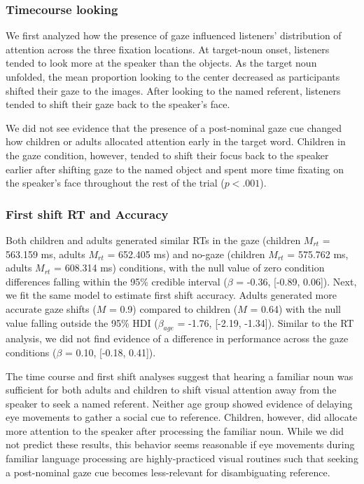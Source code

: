 \documentclass[10pt, letterpaper]{article}
\begin{document}
\hypertarget{timecourse-looking}{%
\subsubsection{Timecourse looking}\label{timecourse-looking}}

We first analyzed how the presence of gaze influenced listeners'
distribution of attention across the three fixation locations. At
target-noun onset, listeners tended to look more at the speaker than the
objects. As the target noun unfolded, the mean proportion looking to the
center decreased as participants shifted their gaze to the images. After
looking to the named referent, listeners tended to shift their gaze back
to the speaker's face.

We did not see evidence that the presence of a post-nominal gaze cue
changed how children or adults allocated attention early in the target
word. Children in the gaze condition, however, tended to shift their
focus back to the speaker earlier after shifting gaze to the named
object and spent more time fixating on the speaker's face throughout the
rest of the trial (\(p < .001\)).

\hypertarget{first-shift-rt-and-accuracy}{%
\subsubsection{First shift RT and
Accuracy}\label{first-shift-rt-and-accuracy}}

Both children and adults generated similar RTs in the gaze (children
\(M_{rt}\) = 563.159 ms, adults \(M_{rt}\) = 652.405 ms) and no-gaze
(children \(M_{rt}\) = 575.762 ms, adults \(M_{rt}\) = 608.314 ms)
conditions, with the null value of zero condition differences falling
within the 95\% credible interval (\(\beta\) = -0.36, {[}-0.89,
0.06{]}). Next, we fit the same model to estimate first shift accuracy.
Adults generated more accurate gaze shifts (\(M\) = 0.9) compared to
children (\(M\) = 0.64) with the null value falling outside the 95\% HDI
(\(\beta_{age}\) = -1.76, {[}-2.19, -1.34{]}). Similar to the RT
analysis, we did not find evidence of a difference in performance across
the gaze conditions (\(\beta\) = 0.10, {[}-0.18, 0.41{]}).

The time course and first shift analyses suggest that hearing a familiar
noun was sufficient for both adults and children to shift visual
attention away from the speaker to seek a named referent. Neither age
group showed evidence of delaying eye movements to gather a social cue
to reference. Children, however, did allocate more attention to the
speaker after processing the familiar noun. While we did not predict
these results, this behavior seems reasonable if eye movements during
familiar language processing are highly-practiced visual routines such
that seeking a post-nominal gaze cue becomes less-relevant for
disambiguating reference.
\end{document}
